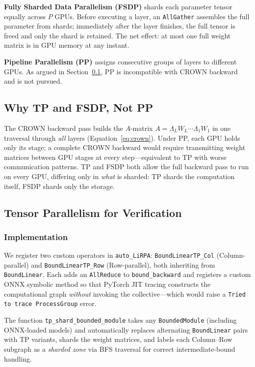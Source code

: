 \documentclass[11pt]{article}
\begin{document}
\textbf{Fully Sharded Data Parallelism (FSDP)} \citep{ZeROPaper} shards each
parameter tensor equally across $P$ GPUs. Before executing a layer, an
\texttt{AllGather} assembles the full parameter from shards; immediately after
the layer finishes, the full tensor is freed and only the shard is retained.
The net effect: at most one full weight matrix is in GPU memory at any instant.

\textbf{Pipeline Parallelism (PP)} \citep{GPipePaper} assigns consecutive
groups of layers to different GPUs. As argued in Section~\ref{sec:why}, PP is
incompatible with CROWN backward and is not pursued.

\subsection{Why TP and FSDP, Not PP}
\label{sec:why}

The CROWN backward pass builds the $A$-matrix
$A = \Lambda_L W_L \cdots \Lambda_1 W_1$ in one traversal through \emph{all}
layers (Equation~\ref{eq:crown}). Under PP, each GPU holds only its stage; a
complete CROWN backward would require transmitting weight matrices between GPU
stages at every step---equivalent to TP with worse communication patterns.
TP and FSDP both allow the full backward pass to run on every GPU, differing
only in \emph{what} is sharded: TP shards the computation itself, FSDP shards
only the storage.

\subsection{Tensor Parallelism for Verification}
\label{sec:tp}

\subsubsection{Implementation}

We register two custom operators in \texttt{auto\_LiRPA}:
\texttt{BoundLinearTP\_Col} (Column-parallel) and
\texttt{BoundLinearTP\_Row} (Row-parallel), both inheriting from
\texttt{BoundLinear}. Each adds an \texttt{AllReduce} to
\texttt{bound\_backward} and registers a custom ONNX symbolic method so that
PyTorch JIT tracing constructs the computational graph \emph{without} invoking
the collective---which would raise a \texttt{Tried to trace ProcessGroup} error.

The function \texttt{tp\_shard\_bounded\_module} takes any \texttt{BoundedModule}
(including ONNX-loaded models) and automatically replaces alternating
\texttt{BoundLinear} pairs with TP variants, shards the weight matrices,
and labels each Column--Row subgraph as a \emph{sharded zone} via BFS
traversal for correct intermediate-bound handling.
\end{document}
